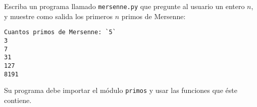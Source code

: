 \begin{enumerate}
  Escriba un programa llamado \lstinline!mersenne.py! que pregunte al
  usuario un entero \(n\), y muestre como salida los primeros \(n\) primos
  de Mersenne:
\begin{lstlisting}[language=testcase]
Cuantos primos de Mersenne: `5`
3
7
31
127
8191
\end{lstlisting}

  Su programa debe importar el módulo \lstinline!primos! y usar las
  funciones que éste contiene.
\end{enumerate}
